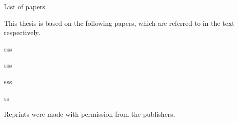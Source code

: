 List of papers

This thesis is based on the following papers, which  are referred to in the text respectively.


sss


sss


sss

ss



Reprints were made with permission from the publishers.